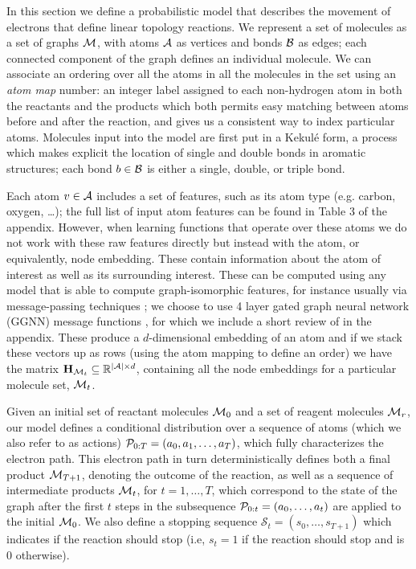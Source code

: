 


In this section we define a probabilistic model that describes the movement of electrons that define linear topology reactions.
We represent a set of molecules as a set of graphs ${\mathcal{M}}$, with atoms ${\mathcal{A}}$ as vertices and bonds ${\mathcal{B}}$ as edges;
each connected component of the graph defines an individual molecule.
We can associate an ordering over all the atoms in all the molecules in the set using an {\em atom map} number:
an integer label assigned to each non-hydrogen atom in both the reactants and the products which 
both permits easy matching between atoms before and after the reaction, and
gives us a consistent way to index particular atoms. Molecules input into the model are first put in a Kekul\'e form, a process which makes explicit the location of single and double bonds in aromatic structures;
each bond $b \in {\mathcal{B}}$ is either a single, double, or triple bond.

Each atom $v \in {\mathcal{A}}$ includes a set of features, such as its atom type (e.g. carbon, oxygen, \dots); the full list of input atom features can be found in Table 3 of the appendix.
 However, when learning functions that operate over these atoms we do not work with these raw features directly but instead with the atom, or equivalently, node embedding. 
 These contain information about the atom of interest as well as its surrounding interest.
 These can be computed using any model that is able to compute graph-isomorphic features, for instance usually via message-passing techniques \citep{gilmer2017neural}; we choose to use 4 layer gated graph neural network (GGNN) message functions \citep{li2016gated}, for which we include a short review of in the appendix. 
 These produce a $d$-dimensional embedding of an atom and if we stack these vectors up as rows (using the atom mapping to define an order)  we have the matrix ${\mathbf{H}}_{{\mathcal{M}}_t} \subseteq \mathbb{R}^{|{\mathcal{A}}|\times d}$, containing all the node embeddings for a particular molecule set, ${\mathcal{M}}_t$.





Given an initial set of reactant molecules ${\mathcal{M}}_0$ and a set of reagent molecules ${\mathcal{M}}_r$, 
our model defines a conditional distribution over a sequence of atoms (which we also refer to as actions) ${\mathcal{P}}_{0:T} = (a_0, a_1, \ldots, a_T)$,
which fully characterizes the electron path.
This electron path in turn deterministically defines both a final product ${\mathcal{M}}_{T+1}$, 
denoting the outcome of the reaction,
as well as a sequence of intermediate products ${\mathcal{M}}_t$, for $t = 1,\dots,T$,
which correspond to the state of the graph after the first $t$ steps in the subsequence ${\mathcal{P}}_{0:t} = (a_0, \dots, a_t)$ are applied to the initial ${\mathcal{M}}_0$. We also define a stopping sequence $\mathcal{S}_t = (s_0, \ldots, s_{T+1})$ which indicates if the reaction should stop (i.e, $s_t\!=\!1$ if the reaction should stop and is $0$ otherwise). 

